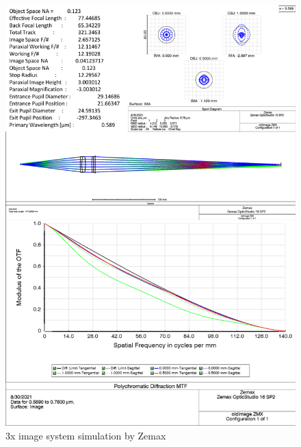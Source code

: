 %
\begin{figure}[htbp]
\begin{center}
\includegraphics[width = \linewidth]{figures/old image.pdf}
\end{center}
\caption[3x image system simulation by Zemax]{3x image system simulation by Zemax}
\label{old_image}
\end{figure}

